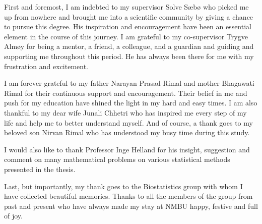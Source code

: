 First and foremost, I am indebted to my supervisor Solve Sæbø who picked
me up from nowhere and brought me into a scientific community by giving
a chance to pursue this degree. His inspiration and encouragement have
been an essential element in the course of this journey. I am grateful
to my co-supervisor Trygve Almøy for being a mentor, a friend, a
colleague, and a guardian and guiding and supporting me throughout this
period. He has always been there for me with my frustration and
excitement.

I am forever grateful to my father Narayan Prasad Rimal and mother
Bhagawati Rimal for their continuous support and encouragement. Their
belief in me and push for my education have shined the light in my hard
and easy times. I am also thankful to my dear wife Junali Chhetri who
has inspired me every step of my life and help me to better understand
myself. And of course, a thank goes to my beloved son Nirvan Rimal who
has understood my busy time during this study.

I would also like to thank Professor Inge Helland for his insight,
suggestion and comment on many mathematical problems on various
statistical methods presented in the thesis.

Last, but importantly, my thank goes to the Biostatistics group with
whom I have collected beautiful memories. Thanks to all the members of
the group from past and present who have always made my stay at NMBU
happy, festive and full of joy.
